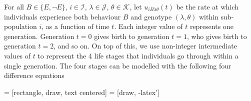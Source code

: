 \documentclass[a4paper,8pt]{extarticle}
\begin{document}
For all $B\in\{E,\lnot E\}$, $i\in\mathcal I$, $\lambda\in\mathcal J$, $\theta\in\mathcal K$, let $u_{iB\lambda\theta}(t)$ be the rate at which individuals experience both behaviour $B$ and genotype $(\lambda,\theta)$ within sub-population $i$, as a function of time $t$. Each integer value of $t$ represents one generation. Generation $t=0$ gives birth to generation $t=1$, who gives birth to generation $t=2$, and so on. On top of this, we use non-integer intermediate values of $t$ to represent the 4 life stages that individuals go through within a single generation. The four stages can be modelled with the following four difference equations

 = [rectangle, draw, text centered]
 = [draw, -latex']

\begin{figure}
    \centering
\end{figure}
\end{document}
